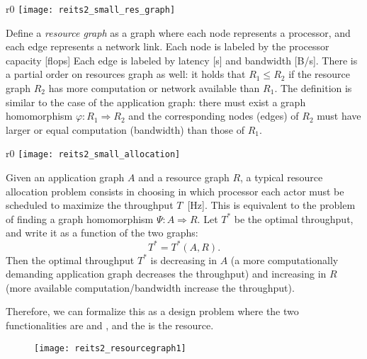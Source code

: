 \begin{wrapfigure}{r}{0\columnwidth}
\texttt{[image: reits2\_small\_res\_graph]}\end{wrapfigure}

Define a\emph{ resource graph} as a graph where each node represents
a processor, and each edge represents a network link. Each node is
labeled by the processor capacity [flops] Each edge is labeled
by latency [s] and bandwidth [B/s]. There is a partial order
on resources graph as well: it holds that $R_1 \leq R_2$ if
the resource graph $R_2$ has more computation or network available
than $R_1$. The definition is similar to the case of the application
graph: there must exist a graph homomorphism $\varphi:R_1  \Rightarrow R_2$
and the corresponding nodes (edges) of $R_2$ must have larger
or equal computation (bandwidth) than those of $R_1$.

\begin{wrapfigure}{r}{0\columnwidth}
\texttt{[image: reits2\_small\_allocation]}\end{wrapfigure}

Given an application graph $A$ and a resource graph $R$, a typical
resource allocation problem consists in choosing in which processor
each actor must be scheduled to maximize the throughput $T$~[Hz].
This is equivalent to the problem of finding a graph homomorphism $\Psi:A \Rightarrow R$.
Let $T^{\ast}$ be the optimal throughput, and write it as a function
of the two graphs:
\[
T^{\ast}=T^{\ast}(A,R).
\]
Then the optimal throughput $T^{*}$ is decreasing in $A$ (a more
computationally demanding application graph decreases the throughput)
and increasing in $R$ (more available computation/bandwidth increase
the throughput).

Therefore, we can formalize this as a design problem where the two
functionalities are  and , and the  is the
resource.

\begin{figure}

\texttt{[image: reits2\_resourcegraph1]}

\caption{}
\end{figure}